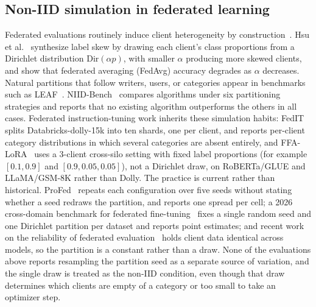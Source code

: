 \subsection{Non-IID simulation in federated learning}
Federated evaluations routinely induce client heterogeneity by construction~\cite{kairouz2021advances}.
Hsu et al.~\cite{hsu2019measuring} synthesize label skew by drawing each client's class proportions from a Dirichlet distribution $\mathrm{Dir}(\alpha p)$, with smaller $\alpha$ producing more skewed clients, and show that federated averaging (FedAvg) accuracy degrades as $\alpha$ decreases.
Natural partitions that follow writers, users, or categories appear in benchmarks such as LEAF~\cite{caldas2018leaf}.
NIID-Bench~\cite{li2022niidbench} compares algorithms under six partitioning strategies and reports that no existing algorithm outperforms the others in all cases.
Federated instruction-tuning work inherits these simulation habits: FedIT~\cite{zhang2024fedit} splits Databricks-dolly-15k into ten shards, one per client, and reports per-client category distributions in which several categories are absent entirely, and FFA-LoRA~\cite{sun2024ffalora} uses a 3-client cross-silo setting with fixed label proportions (for example $[0.1,0.9]$ and $[0.9,0.05,0.05]$), not a Dirichlet draw, on RoBERTa/GLUE and LLaMA/GSM-8K rather than Dolly. The practice is current rather than historical. ProFed~\cite{domini2025profed} repeats each configuration over five seeds without stating whether a seed redraws the partition, and reports one spread per cell; a 2026 cross-domain benchmark for federated fine-tuning~\cite{jimenez2026crossdomain} fixes a single random seed and one Dirichlet partition per dataset and reports point estimates; and recent work on the reliability of federated evaluation~\cite{grosser2026fedpretrain} holds client data identical across models, so the partition is a constant rather than a draw. None of the evaluations above reports resampling the partition seed as a separate source of variation, and the single draw is treated as the non-IID condition, even though that draw determines which clients are empty of a category or too small to take an optimizer step.

